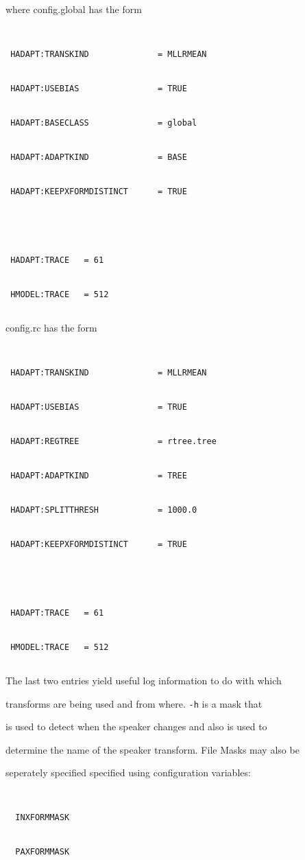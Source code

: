 where config.global has the form


\begin{verbatim}


 HADAPT:TRANSKIND              = MLLRMEAN


 HADAPT:USEBIAS                = TRUE


 HADAPT:BASECLASS              = global


 HADAPT:ADAPTKIND              = BASE


 HADAPT:KEEPXFORMDISTINCT      = TRUE





 HADAPT:TRACE   = 61


 HMODEL:TRACE   = 512


\end{verbatim}


 config.rc has the form


\begin{verbatim}


 HADAPT:TRANSKIND              = MLLRMEAN


 HADAPT:USEBIAS                = TRUE


 HADAPT:REGTREE                = rtree.tree


 HADAPT:ADAPTKIND              = TREE


 HADAPT:SPLITTHRESH            = 1000.0


 HADAPT:KEEPXFORMDISTINCT      = TRUE





 HADAPT:TRACE   = 61


 HMODEL:TRACE   = 512


\end{verbatim}


The last two entries yield useful log information to do with which


transforms are being used and from where.  \texttt{-h} is a mask that


is used to detect when the speaker changes and also is used to


determine the name of the speaker transform. File Masks may also be 


seperately specified specified using configuration variables:


\begin{verbatim}


  INXFORMMASK


  PAXFORMMASK


\end{verbatim}


